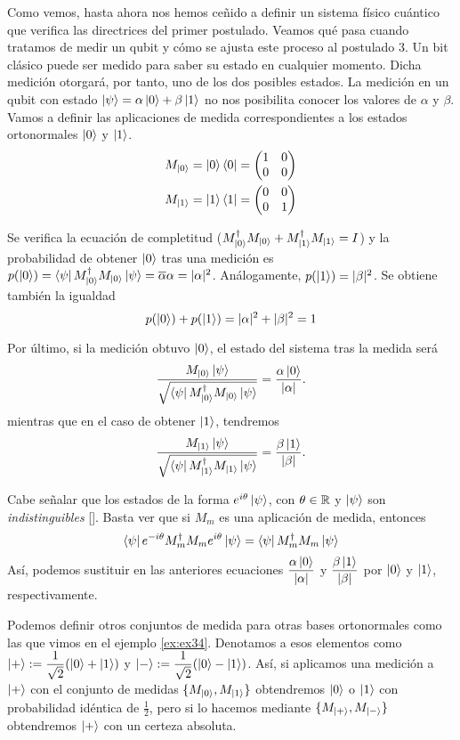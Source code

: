Como vemos, hasta ahora nos hemos ceñido a definir un sistema físico cuántico que verifica las directrices del primer postulado. Veamos qué pasa cuando tratamos de medir un qubit y cómo se ajusta este proceso al postulado 3. Un bit clásico puede ser medido para saber su estado en cualquier momento. Dicha medición otorgará, por tanto, uno de los dos posibles estados. La medición en un qubit con estado $\left|\psi\right\rangle=\alpha\left|0\right\rangle+\beta\left|1\right\rangle$ no nos posibilita conocer los valores de $\alpha$ y $\beta$. Vamos a definir las aplicaciones de medida correspondientes a los estados ortonormales $\left|0\right\rangle$ y $\left|1\right\rangle$.
\[
\begin{split}
M_{\left|0\right\rangle}=\left|0\right\rangle\left\langle0\right|=\left(\begin{matrix}1&0\\0&0\end{matrix}\right)\\
M_{\left|1\right\rangle}=\left|1\right\rangle\left\langle1\right|=\left(\begin{matrix}0&0\\0&1\end{matrix}\right)
\end{split}
\]

Se verifica la ecuación de completitud ($M_{\left|0\right\rangle}^\dag M_{\left|0\right\rangle} + M_{\left|1\right\rangle}^\dag M_{\left|1\right\rangle}=I$) y la probabilidad de obtener $\left|0\right\rangle$ tras una medición es $p(\left|0\right\rangle)=\left\langle\psi\right|M_{\left|0\right\rangle}^\dag M_{\left|0\right\rangle}\left|\psi\right\rangle=\overline{\alpha}\alpha = |\alpha|^2$. Análogamente, $p(\left|1\right\rangle)=|\beta|^2$. Se obtiene también la igualdad
\[p(\left|0\right\rangle)+p(\left|1\right\rangle)=|\alpha|^2+|\beta|^2=1\]

Por último, si la medición obtuvo $\left|0\right\rangle$, el estado del sistema tras la medida será
$$\dfrac{M_{\left|0\right\rangle}\left|\psi\right\rangle}{\sqrt{\left\langle\psi\right|M_{\left|0\right\rangle}^\dag M_{\left|0\right\rangle}\left|\psi\right\rangle}}=\dfrac{\alpha\left|0\right\rangle}{|\alpha|}.
$$
mientras que en el caso de obtener $\left|1\right\rangle$, tendremos
$$\dfrac{M_{\left|1\right\rangle}\left|\psi\right\rangle}{\sqrt{\left\langle\psi\right|M_{\left|1\right\rangle}^\dag M_{\left|1\right\rangle}\left|\psi\right\rangle}}=\dfrac{\beta\left|1\right\rangle}{|\beta|}.
$$

Cabe señalar que los estados de la forma $e^{i\theta}\left|\psi\right\rangle$, con $\theta\in\mathbb{R}$ y $\left|\psi\right\rangle$ son \textit{indistinguibles} [\cite[p.~93]{nielsen2001quantum}]. Basta ver que si $M_m$ es una aplicación de medida, entonces $$\left\langle\psi\right|e^{-i\theta}M_m^\dag M_m e^{i\theta}\left|\psi\right\rangle=\left\langle\psi\right|M_m^\dag M_m\left|\psi\right\rangle$$ 
Así, podemos sustituir en las anteriores ecuaciones $\dfrac{\alpha\left|0\right\rangle}{|\alpha|}$ y $\dfrac{\beta\left|1\right\rangle}{|\beta|}$ por $\left|0\right\rangle$ y $\left|1\right\rangle$, respectivamente.

Podemos definir otros conjuntos de medida para otras bases ortonormales como las que vimos en el ejemplo \ref{ex:ex34}. Denotamos a esos elementos como $\left|+\right\rangle:=\dfrac{1}{\sqrt{2}}(\left|0\right\rangle + \left|1\right\rangle)$ y $\left|-\right\rangle:=\dfrac{1}{\sqrt{2}}(\left|0\right\rangle - \left|1\right\rangle)$. Así, si aplicamos una medición a $\left|+\right\rangle$ con el conjunto de medidas $\{M_{\left|0\right\rangle},M_{\left|1\right\rangle}\}$ obtendremos $\left|0\right\rangle$ o $\left|1\right\rangle$ con probabilidad idéntica de $\frac{1}{2}$, pero si lo hacemos mediante $\{M_{\left|+\right\rangle},M_{\left|-\right\rangle}\}$ obtendremos $\left|+\right\rangle$ con un certeza absoluta.

